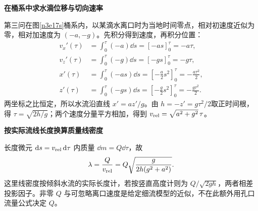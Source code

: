 \begin{solution}
\par\medskip{}\noindent\textbf{在桶系中求水滴位移与切向速率}\par\nobreak
{}
第三问在图\ref{n3e17s}桶系内，以某滴水离口时为当地时间零点，相对初速度近似为零，相对加速度为 $(-a,-g)$。先积分得到速度，再积分位置：
\begin{align*}
 v_x'(\tau)&=\int_0^\tau(-a)\dd s=[-as]_0^\tau=-a\tau,\\
 v_z'(\tau)&=\int_0^\tau(-g)\dd s=[-gs]_0^\tau=-g\tau,\\
 x'(\tau)&=\int_0^\tau(-as)\dd s
 =\left[-\frac a2s^2\right]_0^\tau=-\frac{a\tau^2}{2},\\
 z'(\tau)&=\int_0^\tau(-gs)\dd s
 =\left[-\frac g2s^2\right]_0^\tau=-\frac{g\tau^2}{2}.
\end{align*}
两坐标之比恒定，所以水流沿直线 $x'=az'/g$。由 $h=-z'=g\tau^2/2$取正时间根，得 $\tau=\sqrt{2h/g}$；两个速度分量平方相加，得到 $v_{\rm rel}=\sqrt{a^2+g^2}\,\tau$。

\par\medskip{}\noindent\textbf{按实际流线长度换算质量线密度}\par\nobreak
长度微元 $\mathop{}\!\mathrm d s=v_{\rm rel}\mathop{}\!\mathrm d\tau$ 内质量 $\dd m=Q\dd\tau$，故
\[\lambda=\frac Q{v_{\rm rel}}=Q\sqrt{\frac{g}{2h(g^2+a^2)}}.\]
这里线密度按倾斜水流的实际长度计，若按竖直高度计则为 $Q/\sqrt{2gh}$，两者相差投影因子。非零 $Q$ 与可忽略离口速度是给定细流模型的近似，不在此额外用孔口流量公式决定 $Q$。
\end{solution}

